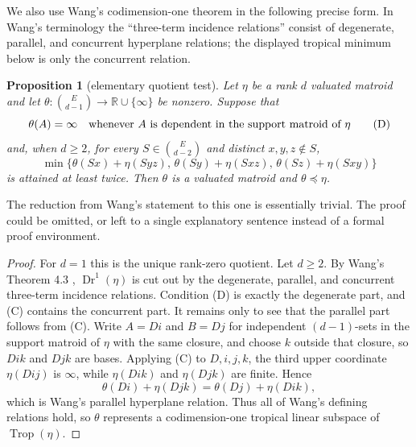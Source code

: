 \documentclass[12pt]{article}
\newcommand{\Dr}{\operatorname{Dr}}
\newcommand{\Trop}{\operatorname{Trop}}
\newtheorem{proposition}{Proposition}
\newcommand{\review}[1]{\begin{reviewbox}#1\end{reviewbox}}
\begin{document}
We also use Wang's codimension-one theorem in the following precise
form.  In Wang's terminology the ``three-term incidence relations''
consist of degenerate, parallel, and concurrent hyperplane relations;
the displayed tropical minimum below is only the concurrent relation.

\begin{proposition}[elementary quotient test]\label{prop:elementarytest}
Let $\eta$ be a rank $d$ valuated matroid and let
$\theta:\binom{E}{d-1}\to{\mathbb R}\cup\{\infty\}$ be nonzero.  Suppose
that
\[
        \theta(A)=\infty\quad\hbox{whenever }A
        \hbox{ is dependent in the support matroid of }\eta              \tag{D}
\]
and, when $d\ge2$, for every $S\in\binom{E}{d-2}$ and distinct $x,y,z\notin S$,
\[
\min\{\theta(Sx)+\eta(Syz),\,
      \theta(Sy)+\eta(Sxz),\,
      \theta(Sz)+\eta(Sxy)\}                                      \tag{C}
\]
is attained at least twice.  Then $\theta$ is a valuated matroid and
$\theta\preceq\eta$.
\end{proposition}

\review{The reduction from Wang's statement to this one is essentially trivial. The proof could be omitted, or left to a single explanatory sentence instead of a formal proof environment.}

\begin{proof}
For $d=1$ this is the unique rank-zero quotient.  Let $d\ge2$.  By
Wang's Theorem 4.3 \cite{Wang}, $\Dr^1(\eta)$ is cut out by the
degenerate, parallel, and concurrent three-term incidence relations.
Condition (D) is exactly the degenerate part, and (C) contains the
concurrent part.  It remains only to see that the parallel part follows
from (C).  Write $A=Di$ and $B=Dj$ for independent $(d-1)$-sets in the
support matroid of $\eta$ with the same closure, and choose $k$ outside
that closure, so $Dik$ and $Djk$ are bases.  Applying (C) to
$D,i,j,k$, the third upper coordinate $\eta(Dij)$ is $\infty$, while
$\eta(Dik)$ and $\eta(Djk)$ are finite.  Hence
\[
        \theta(Di)+\eta(Djk)=\theta(Dj)+\eta(Dik),
\]
which is Wang's parallel hyperplane relation.  Thus all of Wang's
defining relations hold, so $\theta$ represents a codimension-one
tropical linear subspace of $\Trop(\eta)$.
\end{proof}
\end{document}
